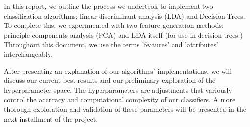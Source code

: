 In this report, we outline the process we undertook to implement two classification algorithms: linear discriminant analysis (LDA) and Decision Trees. To complete this, we experimented with two feature generation methods: principle components analysis (PCA) and LDA itself (for use in decision trees.) Throughout this document, we use the terms 'features' and 'attributes' interchangeably.

After presenting an explanation of our algorithms' implementations, we will discuss our current-best results and our preliminary exploration of the hyperparameter space. The hyperparameters are adjustments that variously control the accuracy and computational complexity of our classifiers. A more thorough exploration and validation of these parameters will be presented in the next installment of the project.